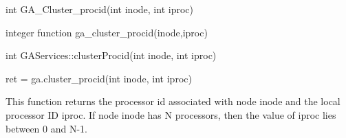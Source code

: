 \documentclass[12pt]{article}
\begin{document}

\begin{capi}
\begin{ccode}
int GA_Cluster_procid(int inode, int iproc)
\end{ccode}
\begin{funcargs}
\end{funcargs}
\end{capi}

\begin{fapi}
\begin{fcode}
integer function ga_cluster_procid(inode,iproc)
\end{fcode}
\begin{funcargs}
\end{funcargs}
\end{fapi}

\begin{cxxapi}
\begin{cxxcode}
int GAServices::clusterProcid(int inode, int iproc)
\end{cxxcode}
\begin{funcargs}
\end{funcargs}
\end{cxxapi}

\begin{pyapi}
\begin{pycode}
ret = ga.cluster_procid(int inode, int iproc)
\end{pycode}
\begin{funcargs}
\end{funcargs}
\end{pyapi}

\local

\begin{desc}

This function returns the processor id associated with node inode and the local
processor ID iproc. If node inode has N processors, then the value of iproc
lies between 0 and N-1.

\end{desc}

\end{document}
